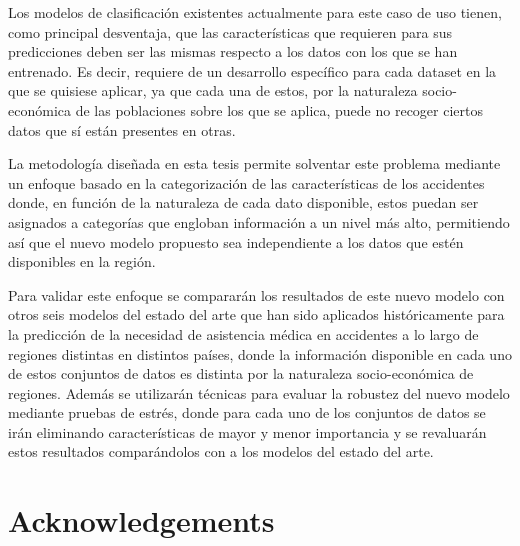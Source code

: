 \documentclass{uathesis-es}
\begin{document}
	Los modelos de clasificación existentes actualmente para este caso de uso tienen, como principal desventaja, que las características que requieren para sus predicciones deben ser las mismas respecto a los datos con los que se han entrenado. 
	Es decir, requiere de un desarrollo específico para cada dataset en la que se quisiese aplicar, ya que cada una de estos, por la naturaleza socio-económica de las poblaciones sobre los que se aplica, puede no recoger ciertos datos que sí están presentes en otras. 
	
	La metodología diseñada en esta tesis permite solventar este problema mediante un enfoque basado en la categorización de las características de los accidentes donde, en función de la naturaleza de cada dato disponible, estos puedan ser asignados a categorías que engloban información a un nivel más alto, permitiendo así que el nuevo modelo propuesto sea independiente a los datos que estén disponibles en la región.
	
	
	Para validar este enfoque se compararán los resultados de este nuevo modelo con otros seis modelos del estado del arte que han sido aplicados históricamente para la predicción de la necesidad de asistencia médica en accidentes a lo largo de regiones distintas en distintos países, donde la información disponible en cada uno de estos conjuntos de datos es distinta por la naturaleza socio-económica de regiones. Además se utilizarán técnicas para evaluar la robustez del nuevo modelo mediante pruebas de estrés, donde para cada uno de los conjuntos de datos se irán eliminando características de mayor y menor importancia y se revaluarán estos resultados comparándolos con a los modelos del estado del arte.
	
	\chapter*{Acknowledgements}
	\addtocounter{chapter}{0}
	
	
	
\end{document}
